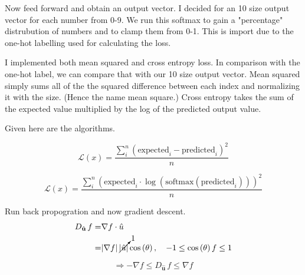 Now feed forward and obtain an output vector. I decided for an 10 size output vector for each number from 0-9. We run this
softmax to gain a "percentage" distrubution of numbers and to clamp them from 0-1. This is import due to the one-hot labelling
used for calculating the loss.

I implemented both mean squared and cross entropy loss. In comparison with the one-hot label, we can compare that with our 10 size
output vector. Mean squared simply sums all of the the squared difference between each index and normalizing it with the size. 
(Hence the name mean square.) Cross entropy takes the sum of the expected value multiplied by the log of the predicted output value.

Given here are the algorithms.

\begin{definition}
    \begin{equation}
        \mathcal{L}(x) = \frac{\sum_{i}^{n} (\text{expected}_i - \text{predicted}_i)^{2}}{n} 
    \end{equation}
\end{definition}

\begin{definition}
    \begin{equation}
        \mathcal{L}(x) = \frac{\sum_{i}^{n} (\text{expected}_i \cdot \log\left(\text{softmax}(\text{predicted}_i) \right))^{2}}{n} 
    \end{equation}
\end{definition}

Run back propogration and now gradient descent.
\begin{align*}
    D_{\mathbf{\hat{u}}} \, f  =& \nabla f \cdot \hat{u} \\
                                  =& |\nabla f| \, \cancelto{1}{|\hat{u}|} \cos\left(\theta\right), \quad -1 \leq \cos\left(\theta\right) f \leq 1
\end{align*}

\begin{equation}
    \Longrightarrow - \nabla f \leq D_{\mathbf{\hat{u}}} \, f \leq \nabla f
\end{equation}

